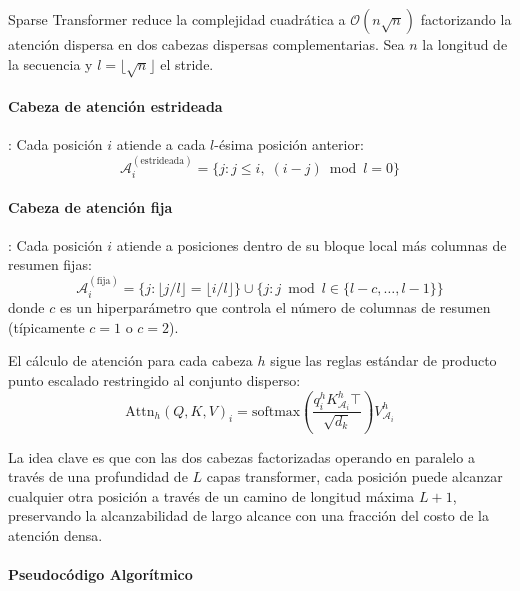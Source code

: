 Sparse Transformer \citep{child_sparse_transformer_2019} reduce la complejidad cuadrática a $\mathcal{O}(n\sqrt{n})$ factorizando la atención dispersa en dos cabezas dispersas complementarias. Sea $n$ la longitud de la secuencia y $l = \lfloor\sqrt{n}\rfloor$ el stride.

\paragraph{Cabeza de atención estrideada}: Cada posición $i$ atiende a cada $l$-ésima posición anterior:
\[
\mathcal{A}_i^{(\text{estrideada})} = \{j : j \leq i,\; (i - j) \bmod l = 0\}
\]

\paragraph{Cabeza de atención fija}: Cada posición $i$ atiende a posiciones dentro de su bloque local más columnas de resumen fijas:
\[
\mathcal{A}_i^{(\text{fija})} = \{j : \lfloor j/l \rfloor = \lfloor i/l \rfloor\} \cup \{j : j \bmod l \in \{l-c, \ldots, l-1\}\}
\]
donde $c$ es un hiperparámetro que controla el número de columnas de resumen (típicamente $c=1$ o $c=2$).

El cálculo de atención para cada cabeza $h$ sigue las reglas estándar de producto punto escalado restringido al conjunto disperso:
\[
\text{Attn}_h(Q, K, V)_i = \text{softmax}\left(\frac{q_i^h K_{\mathcal{A}_i}^h\top}{\sqrt{d_k}}\right) V_{\mathcal{A}_i}^h
\]

La idea clave es que con las dos cabezas factorizadas operando en paralelo a través de una profundidad de $L$ capas transformer, cada posición puede alcanzar cualquier otra posición a través de un camino de longitud máxima $L + 1$, preservando la alcanzabilidad de largo alcance con una fracción del costo de la atención densa.

\paragraph{Pseudocódigo Algorítmico}

